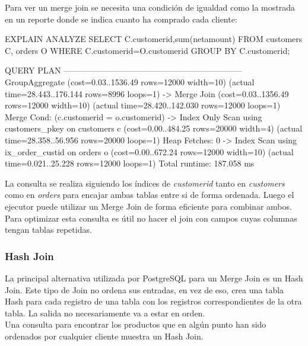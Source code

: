 Para ver un merge join se necesita una condición de igualdad como la mostrada en un reporte donde se indica cuanto ha comprado cada cliente:\\

\begin{pyglist}
EXPLAIN ANALYZE SELECT C.customerid,sum(netamount) FROM customers C,
orders O WHERE C.customerid=O.customerid GROUP BY C.customerid;

QUERY PLAN                                                                        
-----------------------------------------------------------------
 GroupAggregate  (cost=0.03..1536.49 rows=12000 width=10) 
           (actual time=28.443..176.144 rows=8996 loops=1)
   ->  Merge Join  (cost=0.03..1356.49 rows=12000 width=10)
                       (actual time=28.420..142.030 rows=12000 loops=1)
         Merge Cond: (c.customerid = o.customerid)
         ->  Index Only Scan using customers_pkey on customers c 
                               (cost=0.00..484.25 rows=20000 width=4) 
                      (actual time=28.358..56.956 rows=20000 loops=1)
               Heap Fetches: 0
         ->  Index Scan using ix_order_custid on orders o  
                               (cost=0.00..672.24 rows=12000 width=10) 
                             (actual time=0.021..25.228 rows=12000 loops=1)
 Total runtime: 187.058 ms
\end{pyglist}

La consulta se realiza siguiendo los índices de \textit{customerid} tanto en \textit{customers} como en \textit{orders} para encajar ambas tablas entre si de forma ordenada. Luego el ejecutor puede utilizar un Merge Join de forma eficiente para combinar ambos.\\

Para optimizar esta consulta es útil no hacer el join con campos cuyas columnas tengan tablas repetidas.

\subsubsection{Hash Join}

La principal alternativa utilizada por PostgreSQL para un Merge Join es un Hash Join. Este tipo de Join no ordena sus entradas, en vez de eso, crea una tabla Hash para cada registro de una tabla con los registros correspondientes de la otra tabla. La salida no necesariamente va a estar en orden.\\

Una consulta para encontrar los productos que en algún punto han sido ordenados por cualquier cliente muestra un Hash Join.\\

